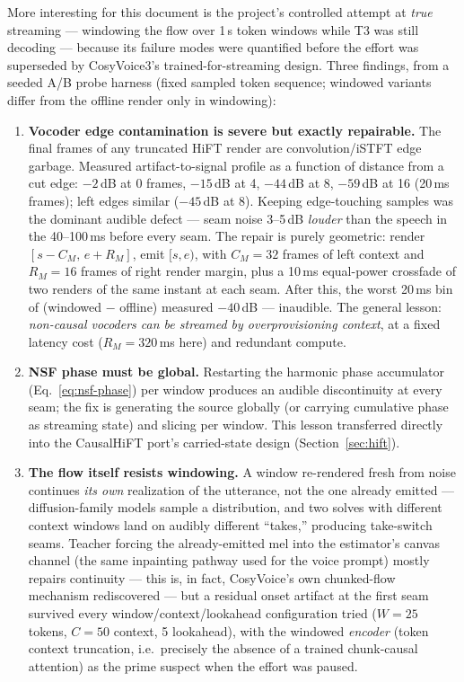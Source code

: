 \documentclass[11pt,a4paper]{article}
\begin{document}
More interesting for this document is the project's controlled attempt at \emph{true}
streaming --- windowing the flow over 1\,s token windows while T3 was still decoding ---
because its failure modes were quantified before the effort was superseded by
CosyVoice3's trained-for-streaming design. Three findings, from a seeded A/B probe
harness (fixed sampled token sequence; windowed variants differ from the offline render
only in windowing):

\begin{enumerate}[leftmargin=2em]
\item \textbf{Vocoder edge contamination is severe but exactly repairable.} The final
frames of any truncated HiFT render are convolution/iSTFT edge garbage. Measured
artifact-to-signal profile as a function of distance from a cut edge: $-2$\,dB at 0
frames, $-15$\,dB at 4, $-44$\,dB at 8, $-59$\,dB at 16 (20\,ms frames); left edges
similar ($-45$\,dB at 8). Keeping edge-touching samples was the dominant audible defect
--- seam noise 3--5\,dB \emph{louder} than the speech in the 40--100\,ms before every
seam. The repair is purely geometric: render $[s{-}C_M,\, e{+}R_M]$, emit $[s, e)$, with
$C_M = 32$ frames of left context and $R_M = 16$ frames of right render margin, plus a
10\,ms equal-power crossfade of two renders of the same instant at each seam. After
this, the worst 20\,ms bin of (windowed $-$ offline) measured $-40$\,dB --- inaudible.
The general lesson: \emph{non-causal vocoders can be streamed by overprovisioning
context}, at a fixed latency cost ($R_M = 320$\,ms here) and redundant compute.
\item \textbf{NSF phase must be global.} Restarting the harmonic phase accumulator
(Eq.~\ref{eq:nsf-phase}) per window produces an audible discontinuity at every seam;
the fix is generating the source globally (or carrying cumulative phase as streaming
state) and slicing per window. This lesson transferred directly into the CausalHiFT
port's carried-state design (Section~\ref{sec:hift}).
\item \textbf{The flow itself resists windowing.} A window re-rendered fresh from noise
continues \emph{its own} realization of the utterance, not the one already emitted ---
diffusion-family models sample a distribution, and two solves with different context
windows land on audibly different ``takes,'' producing take-switch seams. Teacher
forcing the already-emitted mel into the estimator's canvas channel (the same inpainting
pathway used for the voice prompt) mostly repairs continuity --- this is, in fact,
CosyVoice's own chunked-flow mechanism rediscovered --- but a residual onset artifact
at the first seam survived every window/context/lookahead configuration tried
($W{=}25$ tokens, $C{=}50$ context, 5 lookahead), with the windowed \emph{encoder}
(token context truncation, i.e.\ precisely the absence of a trained chunk-causal
attention) as the prime suspect when the effort was paused.
\end{enumerate}
\end{document}
